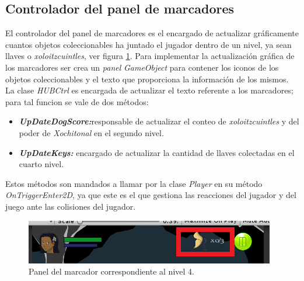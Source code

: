 \subsection{Controlador del panel de marcadores}
El controlador del panel de marcadores es el encargado de actualizar gráficamente cuantos objetos coleccionables ha juntado el jugador dentro de un nivel, ya sean llaves o \textit{xoloitzcuintles}, ver figura \ref{fig:HUB}. Para implementar la actualización gráfica de los marcadores ser crea un \textit{panel} \textit{GameObject} para contener los iconos de los objetos coleccionables y el texto que proporciona la información de los mismos. La clase \textit{HUBCtrl} es encargada de actualizar el texto referente a los marcadores; para tal funcion se vale de dos métodos:

	\begin{itemize}
		\item \textit{\textbf{UpDateDogScore:}}responsable de actualizar el conteo de \textit{xoloitzcuintles} y del poder de \textit{Xochitonal} en el segundo nivel.
		 \item \textit{\textbf{UpDateKeys:}} encargado de actualizar la cantidad de llaves colectadas en el cuarto nivel.
	\end{itemize}	 
	
	Estos métodos son mandados a llamar por la clase \textit{Player} en su método \textit{OnTriggerEnter2D}, ya que este es el que gestiona las reacciones del jugador y del juego ante las colisiones del jugador.

	\begin{figure}[h]
		\centering
		\includegraphics[height=0.05 \textheight]{03TrabajoRealizado/imagenes/HUB.png}
		\caption{Panel del marcador correspondiente al nivel 4.}
		\label{fig:HUB}
	\end{figure} 
	
